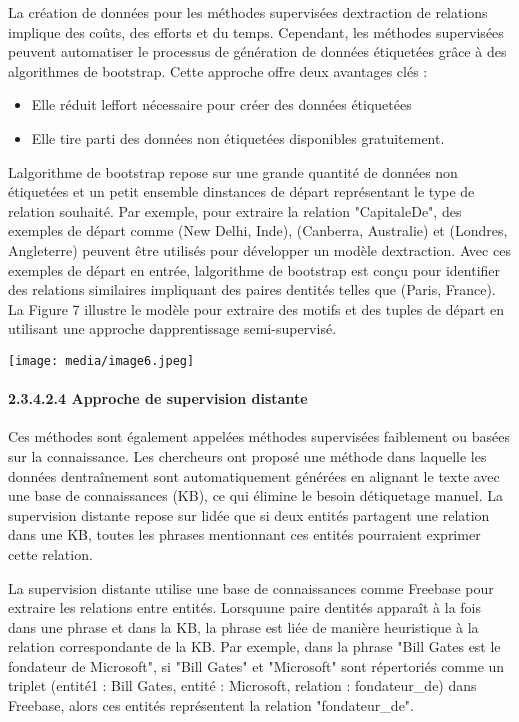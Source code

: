 \documentclass[
]{article}
\begin{document}
La création de données pour les méthodes supervisées
d\textquotesingle extraction de relations implique des coûts, des
efforts et du temps. Cependant, les méthodes supervisées peuvent
automatiser le processus de génération de données étiquetées grâce à des
algorithmes de bootstrap. Cette approche offre deux avantages clés :

\begin{itemize}
\item
  Elle réduit l\textquotesingle effort nécessaire pour créer des données
  étiquetées
\item
  Elle tire parti des données non étiquetées disponibles gratuitement.
\end{itemize}

L\textquotesingle algorithme de bootstrap repose sur une grande quantité
de données non étiquetées et un petit ensemble
d\textquotesingle instances de départ représentant le type de relation
souhaité. Par exemple, pour extraire la relation "CapitaleDe", des
exemples de départ comme (New Delhi, Inde), (Canberra, Australie) et
(Londres, Angleterre) peuvent être utilisés pour développer un modèle
d\textquotesingle extraction. Avec ces exemples de départ en entrée,
l\textquotesingle algorithme de bootstrap est conçu pour identifier des
relations similaires impliquant des paires d\textquotesingle entités
telles que (Paris, France). La Figure 7 illustre le modèle pour extraire
des motifs et des tuples de départ en utilisant une approche
d\textquotesingle apprentissage semi-supervisé.

\texttt{[image: media/image6.jpeg]}

\paragraph{2.3.4.2.4 Approche de supervision
distante}\label{approche-de-supervision-distante}

Ces méthodes sont également appelées méthodes supervisées faiblement ou
basées sur la connaissance. Les chercheurs ont proposé une méthode dans
laquelle les données d\textquotesingle entraînement sont automatiquement
générées en alignant le texte avec une base de connaissances (KB), ce
qui élimine le besoin d\textquotesingle étiquetage manuel. La
supervision distante repose sur l\textquotesingle idée que si deux
entités partagent une relation dans une KB, toutes les phrases
mentionnant ces entités pourraient exprimer cette relation.

La supervision distante utilise une base de connaissances comme Freebase
pour extraire les relations entre entités. Lorsqu\textquotesingle une
paire d\textquotesingle entités apparaît à la fois dans une phrase et
dans la KB, la phrase est liée de manière heuristique à la relation
correspondante de la KB. Par exemple, dans la phrase "Bill Gates est le
fondateur de Microsoft", si "Bill Gates" et "Microsoft" sont répertoriés
comme un triplet (entité1 : Bill Gates, entité : Microsoft, relation :
fondateur\_de) dans Freebase, alors ces entités représentent la relation
"fondateur\_de".
\end{document}
